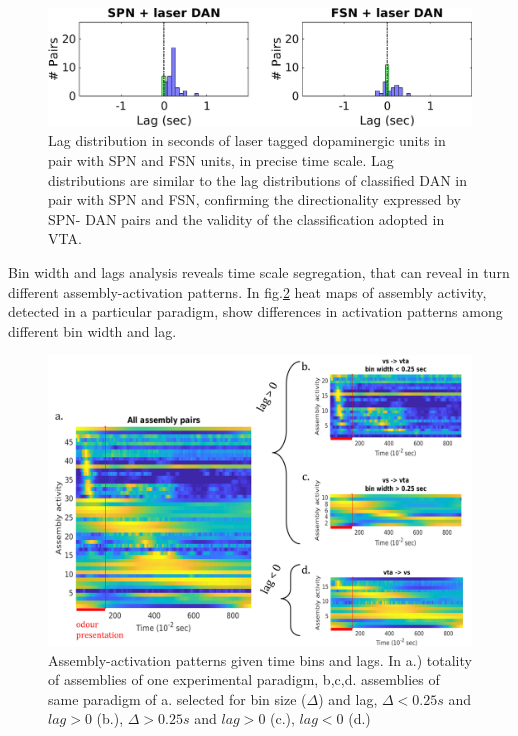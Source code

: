 \begin{figure}[H]
\centering
\includegraphics[scale=0.5]{figures/LagSecLaser3VS.png}
\caption{Lag distribution in seconds of laser tagged dopaminergic units in pair with SPN and FSN units, in precise time scale. Lag distributions are similar to the lag distributions of classified DAN in pair with SPN and FSN, confirming the directionality expressed by SPN- DAN pairs and the validity of the classification adopted in VTA.}
\label{fig:LagInSecLaser}
\end{figure}
Bin width and lags analysis reveals time scale segregation, that can reveal in turn different assembly-activation patterns. In fig.\ref{fig:AsActBinLag} heat maps of assembly activity, detected in a particular paradigm, show differences in activation patterns among different bin width and lag. %
\begin{figure}
    \centering
    \includegraphics[scale=0.45]{figures/AsActPerBinLag1.png}
    \caption{Assembly-activation patterns given time bins and lags. In a.) totality of assemblies of one experimental paradigm, b,c,d. assemblies of same paradigm of a. selected for bin size ($\Delta$) and lag, $\Delta < 0.25 s$ and $lag > 0$ (b.), $\Delta > 0.25 s$ and $lag > 0$ (c.), $lag < 0$ (d.)}
    \label{fig:AsActBinLag}
\end{figure}
